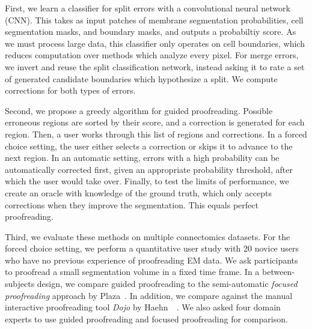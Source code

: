 First, we learn a classifier for split errors with a convolutional neural network (CNN). This takes as input patches of membrane segmentation probabilities, cell segmentation masks, and boundary masks, and outputs a probabiltiy score. As we must process large data, this classifier only operates on cell boundaries, which reduces computation over methods which analyze every pixel. For merge errors, we invert and reuse the split classification network, instead asking it to rate a set of generated candidate boundaries which hypothesize a split. We compute corrections for both types of errors.

Second, we propose a greedy algorithm for guided proofreading. Possible erroneous regions are sorted by their score, and a correction is generated for each region. Then, a user works through this list of regions and corrections. In a forced choice setting, the user either selects a correction or skips it to advance to the next region. In an automatic setting, errors with a high probability can be automatically corrected first, given an appropriate probability threshold, after which the user would take over. Finally, to test the limits of performance, we create an oracle with knowledge of the ground truth, which only accepts corrections when they improve the segmentation. This equals perfect proofreading.

Third, we evaluate these methods on multiple connectomics datasets. For the forced choice setting, we perform a quantitative user study with 20 novice users who have no previous experience of proofreading EM data. We ask participants to proofread a small segmentation volume in a fixed time frame. In a between-subjects design, we compare guided proofreading to the semi-automatic \textit{focused proofreading} approach by Plaza~\cite{focused_proofreading}. In addition, we compare against the manual interactive proofreading tool \textit{Dojo} by Haehn~\etal~\cite{haehn_dojo_2014}. We also asked four domain experts to use guided proofreading and focused proofreading for comparison.


